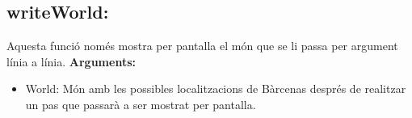 \documentclass[11pt]{article}
\begin{document}
\subsection{writeWorld:}
Aquesta funció només mostra per pantalla el món que se li passa per argument línia a línia.
\textbf{Arguments:}
\begin{itemize}
\item World: Món amb les possibles localitzacions de Bàrcenas després de realitzar un pas que passarà a ser mostrat per pantalla.
\end{itemize}
\end{document}
